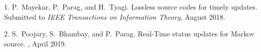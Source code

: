 \documentclass[10pt]{article}
\begin{document}
\begin{shortlist}


\item [1.] P.~Mayekar, P.~Parag, and H.~Tyagi. 
\newblock Lossless source codes for timely updates. 
\newblock Submitted to {\em IEEE Transactions on Information Theory}, August 2018. 



\item [2.] S.~Poojary, S.~Bhambay, and P.~Parag. 
\newblock Real-Time status updates for Markov source.  
, April 2019. 


%



%


\end{shortlist}
\end{document}
